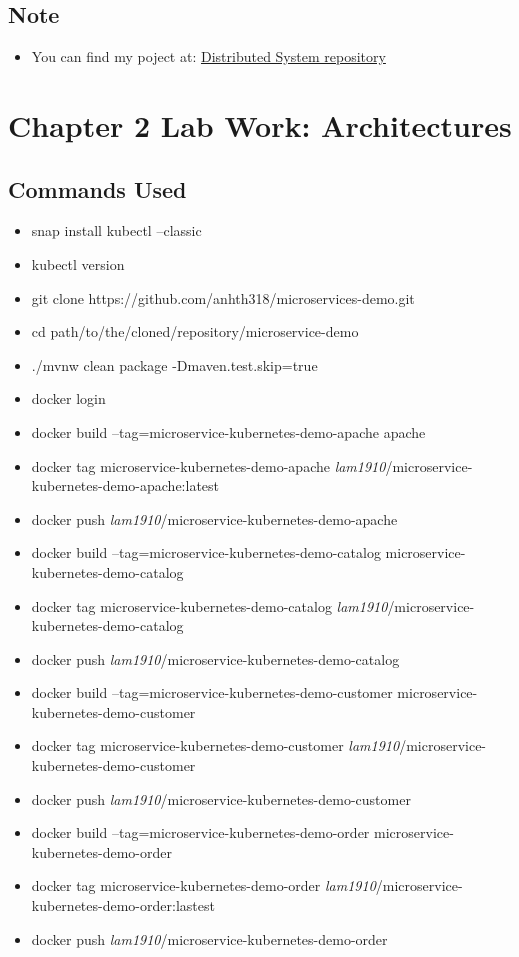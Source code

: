 \documentclass[11pt,a4paper]{report}
\begin{document}
	\section{Note}
	\begin{itemize}
		\item You can find my poject at: \href{https://github.com/lam1910/DistributedSystem}{Distributed System repository}
	\end{itemize}
	
	\chapter{Chapter 2 Lab Work: Architectures}
	\newpage
		\section{Commands Used}
  	\label{sec:cmd}
  	\begin{itemize}
  		\item snap install kubectl --classic
  		\item kubectl version
  		\item git clone https://github.com/anhth318/microservices-demo.git
  		\item cd path/to/the/cloned/repository/microservice-demo
  		\item ./mvnw clean package -Dmaven.test.skip=true
  		\item docker login
  		\item docker build --tag=microservice-kubernetes-demo-apache apache
  		\item docker tag microservice-kubernetes-demo-apache \emph{lam1910}/microservice-kubernetes-demo-apache:latest
  		\item docker push \emph{lam1910}/microservice-kubernetes-demo-apache
  		\item docker build --tag=microservice-kubernetes-demo-catalog microservice-kubernetes-demo-catalog
  		\item docker tag microservice-kubernetes-demo-catalog \emph{lam1910}/microservice-kubernetes-demo-catalog
		\item docker push \emph{lam1910}/microservice-kubernetes-demo-catalog
		\item docker build --tag=microservice-kubernetes-demo-customer microservice-kubernetes-demo-customer
		\item docker tag microservice-kubernetes-demo-customer \emph{lam1910}/microservice-kubernetes-demo-customer
		\item docker push \emph{lam1910}/microservice-kubernetes-demo-customer
		\item docker build --tag=microservice-kubernetes-demo-order microservice-kubernetes-demo-order
		\item docker tag microservice-kubernetes-demo-order \emph{lam1910}/microservice-kubernetes-demo-order:lastest
		\item docker push \emph{lam1910}/microservice-kubernetes-demo-order
  	\end{itemize}
\end{document}
